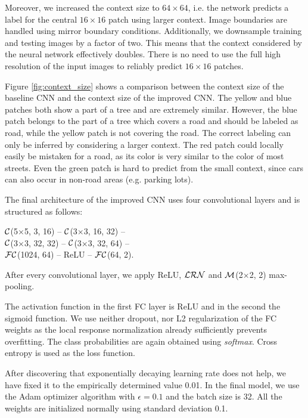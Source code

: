 \documentclass[10pt,conference,compsocconf]{IEEEtran}
\newcommand{\conv}[3]{$ \cal{C} $(#1$ \times  $#1, #2, #3)}
\newcommand{\maxpool}[2]{$ \cal{M} $(#1$ \times $#1, #2)}
\newcommand{\lrn}{$ \cal{LRN}~$}
\newcommand{\fc}[2]{$ \cal{FC} $(#1, #2)}
\begin{document}
Moreover, we increased the context size to $ 64\times64 $, i.e. the network predicts a label for the central $ 16\times16 $ patch using larger context. Image boundaries are handled using mirror boundary conditions. Additionally, we downsample training and testing images by a factor of two. This means that the context considered by the neural network effectively doubles. There is no need to use the full high resolution of the input images to reliably predict $ 16 \times 16 $ patches.

\par
Figure \ref{fig:context_size} shows a comparison between the context size of the baseline CNN and the context size of the improved CNN. The yellow and blue patches both show a part of a tree and are extremely similar. However, the blue patch belongs to the part of a tree which covers a road and should be labeled as road, while the yellow patch is not covering the road. The correct labeling can only be inferred by considering a larger context. The red patch could locally easily be mistaken for a road, as its color is very similar to the color of most streets. Even the green patch is hard to predict from the small context, since cars can also occur in non-road areas (e.g. parking lots).

\par
The final architecture of the improved CNN uses four convolutional layers and is structured as follows:
\begin{center}
	\conv{5}{3}{16} -- \conv{3}{16}{32} -- \\ 
	\conv{3}{32}{32} -- \conv{3}{32}{64} -- \\
	\fc{1024}{64} -- ReLU -- \fc{64}{2}.
\end{center}
After every convolutional layer, we apply ReLU, \lrn and \maxpool{2}{2} max-pooling.

The activation function in the first FC layer is ReLU and in the second the sigmoid function. We use neither dropout, nor L2 regularization of the FC weights as the local response normalization already sufficiently prevents overfitting. The class probabilities are again obtained using \textit{softmax}. Cross entropy is used as the loss function.

After discovering that exponentially decaying learning rate does not help, we have fixed it to the empirically determined value 0.01. 
In the final model, we use the Adam optimizer algorithm \cite{Adam.2014} with $ \epsilon = 0.1 $ and the batch size is 32. All the weights are initialized normally using standard deviation 0.1.
\end{document}
